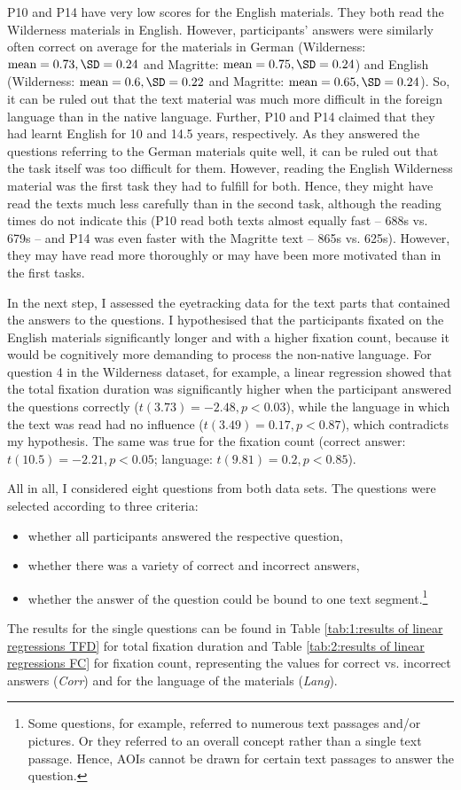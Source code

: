 \documentclass[output=paper]{langscibook}
\begin{document}
P10 and P14 have very low scores for the English materials. They both read the Wilderness materials in English. However, participants' answers were similarly often correct on average for the materials in German (Wilderness: $\text{mean}=0.73, \SD=0.24$ and Magritte: $\text{mean}=0.75, \SD=0.24$) and English (Wilderness: $\text{mean}=0.6, \SD=0.22$ and Magritte: $\text{mean}=0.65, \SD=0.24$). So, it can be ruled out that the text material was much more difficult in the foreign language than in the native language. Further, P10 and P14 claimed that they had learnt English for 10 and 14.5 years, respectively. As they answered the questions referring to the German materials quite well, it can be ruled out that the task itself was too difficult for them. However, reading the English Wilderness material was the first task they had to fulfill for both. Hence, they might have read the texts much less carefully than in the second task, although the reading times do not indicate this (P10 read both texts almost equally fast -- 688s vs. 679s -- and P14 was even faster with the Magritte text -- 865s vs. 625s). However, they may have read more thoroughly or may have been more motivated than in the first tasks.

In the next step, I assessed the eyetracking data for the text parts that contained the answers to the questions. I hypothesised that the participants fixated on the English materials significantly longer and with a higher fixation count, because it would be cognitively more demanding to process the non-native language. For question 4 in the Wilderness dataset, for example, a linear regression showed that the total fixation duration was significantly higher when the participant answered the questions correctly ($t(3.73)= -2.48, p< 0.03$), while the language in which the text was read had no influence ($t(3.49)= 0.17, p< 0.87$), which contradicts my hypothesis. The same was true for the fixation count (correct answer: $t(10.5)= -2.21, p< 0.05$; language: $t(9.81)= 0.2, p< 0.85$). 

All in all, I considered eight questions from both data sets. The questions were selected according to three criteria: 

\begin{itemize}
    \item whether all participants answered the respective question, 
    \item whether there was a variety of correct and incorrect answers,
    \item whether the answer of the question could be bound to one text segment.\footnote{Some questions, for example, referred to numerous text passages and/or pictures. Or they referred to an overall concept rather than a single text passage. Hence, AOIs cannot be drawn for certain text passages to answer the question.}
\end{itemize}
The results for the single questions can be found in Table \ref{tab:1:results of linear regressions TFD} for total fixation duration and Table \ref{tab:2:results of linear regressions FC} for fixation count, representing the values for correct vs. incorrect answers (\textit{Corr}) and for the language of the materials (\textit{Lang}).
\end{document}
